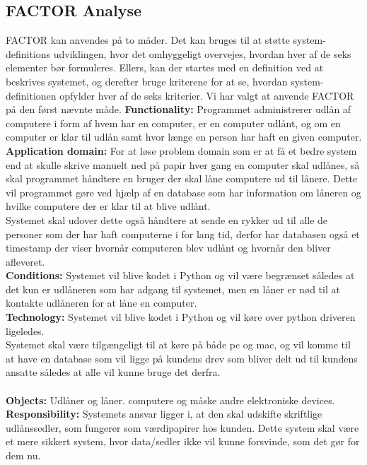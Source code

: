 \documentclass[a4paper]{article}
\begin{document}
\subsection{FACTOR Analyse}
FACTOR kan anvendes på to måder. Det kan bruges til at støtte system-definitions udviklingen, hvor det omhyggeligt overvejes, hvordan hver af de seks elementer bør formuleres. Ellers, kan der startes med en definition ved at beskrives systemet, og derefter bruge kriterene for at se, hvordan system-definitionen opfylder hver af de seks kriterier. Vi har valgt at anvende FACTOR på den først nævnte måde.
\textbf{Functionality:} Programmet administrerer udlån af computere i form af hvem har en computer, er en computer udlånt, og om en computer er klar til udlån samt hvor længe en person har haft en given computer.\\
\textbf{Application domain:} For at løse problem domain som er at få et bedre system end at skulle skrive manuelt ned på papir hver gang en computer skal udlånes, så skal programmet håndtere en bruger der skal låne computere ud til lånere. Dette vil programmet gøre ved hjælp af en database som har information om låneren og hvilke computere der er klar til at blive udlånt.\\
Systemet skal udover dette også håndtere at sende en rykker ud til alle de personer som der har haft computerne i for lang tid, derfor har databasen også et timestamp der viser hvornår computeren blev udlånt og hvornår den bliver afleveret.\\
\textbf{Conditions:} Systemet vil blive kodet i Python og vil være begrænset således at det kun er udlåneren som har adgang til systemet, men en låner er nød til at kontakte udlåneren for at låne en computer.\\
\textbf{Technology:} Systemet vil blive kodet i Python og vil køre over python driveren ligeledes.\\
Systemet skal være tilgængeligt til at køre på både pc og mac, og vil komme til at have en database som vil ligge på kundens drev som bliver delt ud til kundens ansatte således at alle vil kunne bruge det derfra.\\
\\
\textbf{Objects:} Udlåner og låner. computere og måske andre elektroniske devices.\\
\textbf{Responsibility:} Systemets ansvar ligger i, at den skal udskifte skriftlige udlånssedler, som fungerer som værdipapirer hos kunden. Dette system skal være et mere sikkert system, hvor data/sedler ikke vil kunne forsvinde, som det gør for dem nu.
\end{document}
